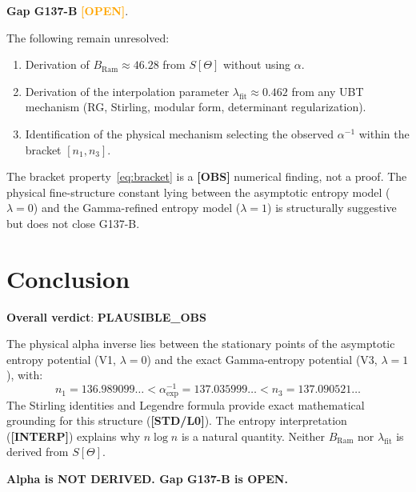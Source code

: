 \documentclass[12pt,a4paper]{article}
\theoremstyle{definition}
\theoremstyle{remark}
\newcommand{\STDLZ}{\textcolor{gray!70!black}{\textbf{[STD/L0]}}}
\newcommand{\INTERP}{\textcolor{blue!60!black}{\textbf{[INTERP]}}}
\newcommand{\OBS}{\textcolor{orange!70!black}{\textbf{[OBS]}}}
\newcommand{\OPEN}{\textcolor{orange}{\textbf{[OPEN]}}}
\newcommand{\BRam}{B_{\mathrm{Ram}}}
\begin{document}
\begin{gapbox}
\textbf{Gap G137-B} \OPEN{}.

The following remain unresolved:
\begin{enumerate}
  \item Derivation of $\BRam \approx 46.28$ from $S[\Theta]$ without using $\alpha$.
  \item Derivation of the interpolation parameter $\lambda_{\mathrm{fit}} \approx 0.462$
        from any UBT mechanism (RG, Stirling, modular form, determinant regularization).
  \item Identification of the physical mechanism selecting the observed $\alpha^{-1}$
        within the bracket $[n_1, n_3]$.
\end{enumerate}

The bracket property~\eqref{eq:bracket} is a \OBS{} numerical finding, not a proof.
The physical fine-structure constant lying between the asymptotic entropy model
($\lambda = 0$) and the Gamma-refined entropy model ($\lambda = 1$) is structurally
suggestive but does not close G137-B.
\end{gapbox}

\section{Conclusion}
\label{sec:conclusion}

\begin{statusbox}
\textbf{Overall verdict}: \textbf{PLAUSIBLE\_OBS}

The physical alpha inverse lies between the stationary points of the asymptotic
entropy potential (V1, $\lambda=0$) and the exact Gamma-entropy potential
(V3, $\lambda=1$), with:
\[
  n_1 = 136.989099\ldots < \alpha_{\mathrm{exp}}^{-1} = 137.035999\ldots < n_3 = 137.090521\ldots
\]
The Stirling identities and Legendre formula provide exact mathematical grounding
for this structure (\STDLZ).  The entropy interpretation (\INTERP) explains why
$n\log n$ is a natural quantity.  Neither $\BRam$ nor $\lambda_{\mathrm{fit}}$ is
derived from $S[\Theta]$.

\textbf{Alpha is NOT DERIVED.  Gap G137-B is OPEN.}
\end{statusbox}

\ifdefined\INCLUDEMODE
\else
  
\end{document}
